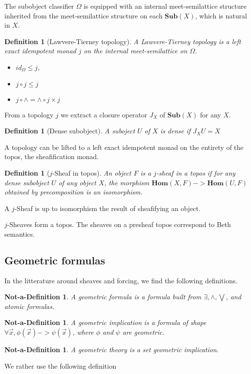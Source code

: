 \documentclass[11pt]{article}
\newtheorem{definition}[theorem]{Definition}
\newtheorem{ndefinition}[theorem]{Not-a-Definition}
\newcommand{\0}{\mathbf{0}}
\newcommand{\1}{\mathbf{1}}
\begin{document}
The subobject classifier $\Omega$ is equipped with an internal meet-semilattice structure inherited from the meet-semilattice structure on each $\mathbf{Sub}(X)$, which is natural in $X$.

\begin{definition}[Lawvere-Tierney topology]
    A \emph{Lawvere-Tierney topology} is a left exact idempotent monad $j$ on the internal meet-semilattice on $\Omega$.
\begin{itemize}
    \item $ id_\Omega \leq j $,
    \item $ j\circ j \leq  j$
    \item $ j \circ \wedge = \wedge \circ j\times j$
\end{itemize}
\end{definition}

From a topology $j$ we extract a closure operator $J_X$ of $\mathbf{Sub}(X)$ for any $X$.
\begin{definition}[Dense subobject]
    A suboject $U$ of $X$ is dense if $J_XU  = X$
\end{definition}

A topology can be lifted to a left exact idempotent monad on the entirety of the topos, the sheafification monad.

\begin{definition}[$j$-Sheaf in topos]
    An object $F$ is a $j$-\emph{sheaf} in a topos if for any dense subobject $U$ of any object $X$, the morphism $\mathbf{Hom}(X, F) -> \mathbf{Hom}(U, F)$ obtained by precomposition is an isomorphism.
\end{definition}

A $j$-Sheaf is up to isomorphism the result of sheafifying an object.

$j$-Sheaves form a topos. The sheaves on a presheaf topos correspond to Beth semantics.

\subsection{Geometric formulas}
In the litterature around sheaves and forcing, we find the following definitions.
\begin{ndefinition}
A \emph{geometric formula} is a formula built from $\exists, \wedge,\bigvee$, and atomic formulas.
\end{ndefinition}
\begin{ndefinition}
A \emph{geometric implication} is a formula of shape $\forall \overrightarrow{x}, \phi(\overrightarrow{x}) -> \psi(\overrightarrow{x})$, where $\phi$ and $\psi$ are geometric.
\end{ndefinition}
\begin{ndefinition}
    A \emph{geometric theory} is a set geometric implication.
\end{ndefinition}
We rather use the following definition
\end{document}
